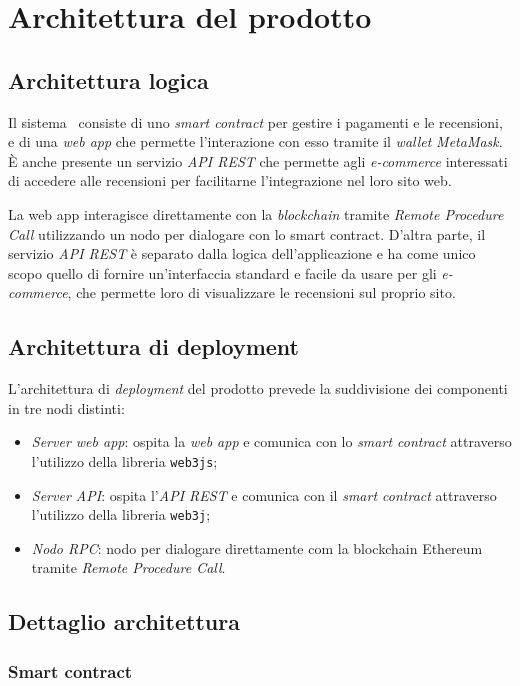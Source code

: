 \section{Architettura del prodotto}

\subsection{Architettura logica}
Il sistema \capName\ consiste di uno \textit{smart contract} per gestire i pagamenti e le recensioni, e di una \textit{web app} che permette l'interazione con esso tramite il \textit{wallet} \textit{MetaMask}. È anche presente un servizio \textit{API REST} che permette agli \textit{e-commerce} interessati di accedere alle recensioni per facilitarne l'integrazione nel loro sito web.

La web app interagisce direttamente con la \textit{blockchain} tramite \textit{Remote Procedure Call} utilizzando un nodo per dialogare con lo smart contract. D'altra parte, il servizio \textit{API REST} è separato dalla logica dell'applicazione e ha come unico scopo quello di fornire un'interfaccia standard e facile da usare per gli \textit{e-commerce}, che permette loro di visualizzare le recensioni sul proprio sito.

\subsection{Architettura di deployment}
L'architettura di \textit{deployment} del prodotto prevede la suddivisione dei componenti in tre nodi distinti:
\begin{itemize}
    \item \textit{Server web app}: ospita la \textit{web app} e comunica con lo \textit{smart contract} attraverso l'utilizzo della libreria \texttt{web3js};
    \item \textit{Server API}: ospita l'\textit{API REST} e comunica con il \textit{smart contract} attraverso l'utilizzo della libreria \texttt{web3j};
    \item \textit{Nodo RPC}: nodo per dialogare direttamente com la blockchain Ethereum tramite \textit{Remote Procedure Call}.
\end{itemize}
\pagebreak

\subsection{Dettaglio architettura}
\subsubsection{Smart contract}

